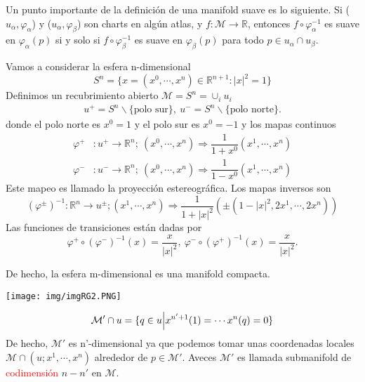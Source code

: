 \documentclass[../main]{subfiles}
\begin{document}
Un punto importante de la definición de una manifold suave es lo siguiente. Si ($u_{\alpha}, \varphi_{\alpha}$) y ($u_{\alpha}, \varphi_{\beta}$) son charts en algún atlas, y $f:\mathcal{M}\rightarrow \mathbb{R}$, entonces $f\circ \varphi^{-1}_{\alpha}$ es suave en $\varphi_{\alpha}(p)$ si y solo si $f\circ \varphi^{-1}_{\beta}$ es suave en $\varphi_{\beta}(p)$ para todo $p\in u_{\alpha} \cap u_{\beta}$.

Vamos a considerar la esfera n-dimensional
\begin{equation}
    S^n=\{x=(x^0, \cdots, x^n) \in \mathbb{R}^{n+1}: |x|^2=1\}
\end{equation}
Definimos un recubrimiento abierto $\mathcal{M}=S^n=\cup_i u_i$
\begin{align}
    u^{+}=S^n \backslash \{ \text{polo sur}\}, \ u^{-}=S^n \backslash \{ \text{polo norte}\}.
\end{align}
donde el polo norte es $x^0=1$ y el polo sur es $x^0=-1$ y los mapas continuos
\begin{equation}
    \begin{split}
        \varphi^+&: u^+\rightarrow \mathbb{R}^n; \ (x^0, \cdots, x^n) \Rightarrow \dfrac{1}{1+x^0}(x^1, \cdots, x^n)\\
        \varphi^-&: u^-\rightarrow \mathbb{R}^n; \ (x^0, \cdots, x^n) \Rightarrow \dfrac{1}{1-x^0}(x^1, \cdots, x^n)
    \end{split}
\end{equation}
Este mapeo es llamado la proyección estereográfica. Los mapas inversos son
\begin{equation}
    (\varphi^{\pm})^{-1}: \mathbb{R}^n \rightarrow u^{\pm}; (x^1, \cdots, x^n) \Rightarrow \dfrac{1}{1+|x|^2}(\pm(1-|x|^2, 2x^1, \cdots, 2x^n))
\end{equation}
Las funciones de transiciones están dadas por
\begin{equation}
    \varphi^+ \circ (\varphi^-)^{-1}(x)=\dfrac{x}{|x|^2}, \ \varphi^- \circ (\varphi^+)^{-1}(x)=\dfrac{x}{|x|^2}.
\end{equation}

De hecho, la esfera m-dimensional es una manifold compacta.
\begin{center}
    \texttt{[image: img/imgRG2.PNG]}
\end{center}

\begin{equation}
    \mathcal{M}' \cap u=\{ q\in u \Big{|} x^{n'+1}(1)=\cdots x^n(q)=0\}
\end{equation}
De hecho, $\mathcal{M}'$ es n'-dimensional ya que podemos tomar unas coordenadas locales $\mathcal{M}\cap (u; x^1, \cdots, x^n)$ alrededor de $p\in \mathcal{M}'$. Aveces $\mathcal{M}'$ es llamada submanifold de \textcolor{red}{codimensión} $n-n'$ en $\mathcal{M}$. 
\end{document}
